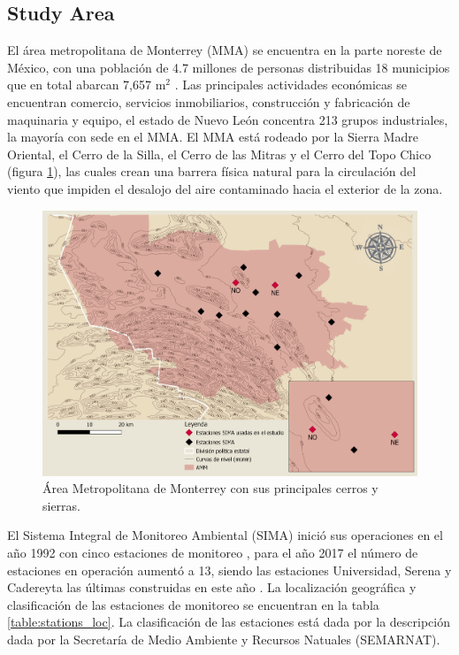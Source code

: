 \subsection{Study Area}
El área metropolitana de Monterrey (MMA) se encuentra en la parte noreste de México, con una población de 4.7 millones de personas distribuidas 18 municipios que en total abarcan 7,657 m$^2$ \cite{inegi2015}. Las principales actividades económicas se encuentran comercio, servicios inmobiliarios, construcción y fabricación de maquinaria y equipo, el estado de Nuevo León concentra 213 grupos industriales, la mayoría con sede en el MMA. El MMA está rodeado por la Sierra Madre Oriental, el Cerro de la Silla, el Cerro de las Mitras y el Cerro del Topo Chico (figura \ref{fig:map}), las cuales crean una barrera física natural para la circulación del viento que impiden el desalojo del aire contaminado hacia el exterior de la zona.\cite{proaire2008}
\begin{figure}[H]
    \centering
    \includegraphics[scale=0.2]{images/map.png}
    \caption{Área Metropolitana de Monterrey con sus principales cerros y sierras.}
    \label{fig:map}
\end{figure}
El Sistema Integral de Monitoreo Ambiental (SIMA) inició sus operaciones en el año 1992 con cinco estaciones de monitoreo , para el año 2017 el número de estaciones en operación aumentó a 13, siendo las estaciones Universidad, Serena y Cadereyta las últimas construidas en este año \cite{simapage}. La localización geográfica y clasificación de las estaciones de monitoreo se encuentran en la tabla \ref{table:stations_loc}. La clasificación de las estaciones está dada por la descripción dada por la Secretaría de Medio Ambiente y Recursos Natuales (SEMARNAT). \cite{proaire2016}

